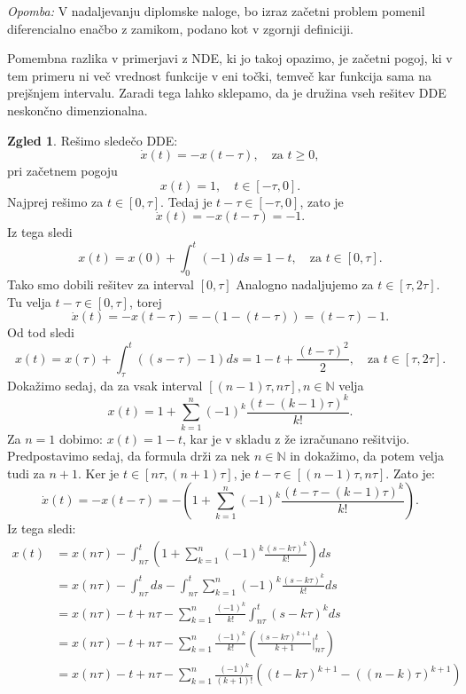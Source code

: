 \documentclass[12pt,a4paper]{amsart}
\theoremstyle{definition} %
\newtheorem{zgled}[definicija]{Zgled}
\theoremstyle{plain} %
\newcommand{\N}{\mathbb N}
\begin{document}
\noindent\textit{Opomba:} V nadaljevanju diplomske naloge, bo izraz začetni problem pomenil diferencialno enačbo z zamikom, podano kot v 
zgornji definiciji.

Pomembna razlika v primerjavi z NDE, ki jo takoj opazimo, je začetni pogoj, ki v tem primeru ni več vrednost 
funkcije v eni točki, temveč kar funkcija sama na prejšnjem intervalu. Zaradi tega lahko sklepamo, da je družina vseh rešitev DDE neskončno
dimenzionalna.

\begin{zgled}
    Rešimo sledečo DDE:
    \[\dot{x}(t)=-x(t-\tau), \quad \text{za } t \geq 0,\]
    pri začetnem pogoju \[x(t)=1, \quad t \in [-\tau,0].\]
    Najprej rešimo za $t \in [0,\tau]$. Tedaj je $t-\tau \in [-\tau,0]$, zato je
    \[\dot{x}(t)=-x(t-\tau)=-1.\]
    Iz tega sledi
    \[x(t)=x(0)+ \int_{0}^{t}(-1)ds = 1-t, \quad \text{za } t \in [0,\tau].\]
    Tako smo dobili rešitev za interval $[0,\tau]$
    Analogno nadaljujemo za $t \in [\tau, 2\tau]$. Tu velja $t-\tau \in [0,\tau]$, torej
    \[\dot{x}(t)=-x(t-\tau)=-(1-(t-\tau))=(t-\tau)-1.\]
    Od tod sledi
    \[x(t)=x(\tau)+\int_{\tau}^{t}((s-\tau)-1)ds=1-t+\frac{(t-\tau)^2}{2},\quad \text{za }t\in[\tau,2\tau].\]
    Dokažimo sedaj, da za vsak interval $[(n-1)\tau,n\tau], n\in \N$ velja
    \[x(t)=1+\sum_{k=1}^{n}(-1)^k\frac{(t-(k-1)\tau)^k}{k!}.\]
    Za $n=1$ dobimo: $x(t)=1-t$, kar je v skladu z že izračunano rešitvijo.
    Predpostavimo sedaj, da formula drži za nek $n \in \N$ in dokažimo, da potem velja tudi za $n+1$.
    Ker je $t \in [n\tau,(n+1)\tau]$, je $t-\tau \in [(n-1)\tau, n\tau]$. Zato je:
    \[ \dot{x}(t)=-x(t-\tau)=-\left(1+\sum_{k=1}^{n}(-1)^k\frac{(t-\tau-(k-1)\tau)^k}{k!}\right).\]
    Iz tega sledi:
    \begin{equation*}
    \begin{split}
        x(t) &= x(n\tau) - \int_{n\tau}^{t}\left(1+\sum_{k=1}^{n}(-1)^k\frac{(s-k\tau)^k}{k!}\right)ds \\
        & = x(n\tau) - \int_{n\tau}^{t}ds - \int_{n\tau}^{t}\sum_{k=1}^{n}(-1)^k\frac{(s-k\tau)^k}{k!}ds \\
        & = x(n\tau) - t + n\tau - \sum_{k=1}^{n}\frac{(-1)^k}{k!}\int_{n\tau}^{t}(s-k\tau)^{k}ds \\
        & = x(n\tau) - t + n\tau - \sum_{k=1}^{n}\frac{(-1)^k}{k!}\left(\frac{(s-k\tau)^{k+1}}{k+1}\Bigr|_{n\tau}^{t}\right) \\
        & = x(n\tau) - t + n\tau - \sum_{k=1}^{n}\frac{(-1)^k}{(k+1)!}\left((t-k\tau)^{k+1}-((n-k)\tau)^{k+1}\right) \\

\end{split}
\end{equation*}
\end{zgled}
\end{document}
